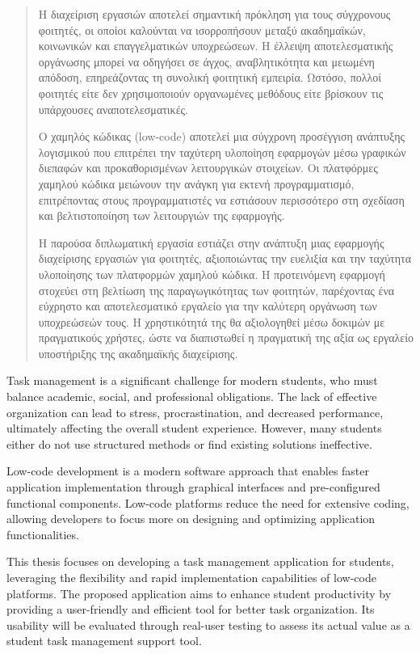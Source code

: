 \begin{abstract}
    Η διαχείριση εργασιών αποτελεί σημαντική πρόκληση για τους σύγχρονους φοιτητές, οι οποίοι καλούνται να ισορροπήσουν μεταξύ ακαδημαϊκών, κοινωνικών και επαγγελματικών υποχρεώσεων. Η έλλειψη αποτελεσματικής οργάνωσης μπορεί να οδηγήσει σε άγχος, αναβλητικότητα και μειωμένη απόδοση, επηρεάζοντας τη συνολική φοιτητική εμπειρία. Ωστόσο, πολλοί φοιτητές είτε δεν χρησιμοποιούν οργανωμένες μεθόδους είτε βρίσκουν τις υπάρχουσες αναποτελεσματικές.

    Ο χαμηλός κώδικας (low-code) αποτελεί μια σύγχρονη προσέγγιση ανάπτυξης λογισμικού που επιτρέπει την ταχύτερη υλοποίηση εφαρμογών μέσω γραφικών διεπαφών και προκαθορισμένων λειτουργικών στοιχείων. Οι πλατφόρμες χαμηλού κώδικα μειώνουν την ανάγκη για εκτενή προγραμματισμό, επιτρέποντας στους προγραμματιστές να εστιάσουν περισσότερο στη σχεδίαση και βελτιστοποίηση των λειτουργιών της εφαρμογής.

    Η παρούσα διπλωματική εργασία εστιάζει στην ανάπτυξη μιας εφαρμογής διαχείρισης εργασιών για φοιτητές, αξιοποιώντας την ευελιξία και την ταχύτητα υλοποίησης των πλατφορμών χαμηλού κώδικα. Η προτεινόμενη εφαρμογή στοχεύει στη βελτίωση της παραγωγικότητας των φοιτητών, παρέχοντας ένα εύχρηστο και αποτελεσματικό εργαλείο για την καλύτερη οργάνωση των υποχρεώσεών τους. Η χρηστικότητά της θα αξιολογηθεί μέσω δοκιμών με πραγματικούς χρήστες, ώστε να διαπιστωθεί η πραγματική της αξία ως εργαλείο υποστήριξης της ακαδημαϊκής διαχείρισης.

\end{abstract}


\begin{abstracteng}
    Task management is a significant challenge for modern students, who must balance academic, social, and professional obligations. The lack of effective organization can lead to stress, procrastination, and decreased performance, ultimately affecting the overall student experience. However, many students either do not use structured methods or find existing solutions ineffective.

    Low-code development is a modern software approach that enables faster application implementation through graphical interfaces and pre-configured functional components. Low-code platforms reduce the need for extensive coding, allowing developers to focus more on designing and optimizing application functionalities.

    This thesis focuses on developing a task management application for students, leveraging the flexibility and rapid implementation capabilities of low-code platforms. The proposed application aims to enhance student productivity by providing a user-friendly and efficient tool for better task organization. Its usability will be evaluated through real-user testing to assess its actual value as a student task management support tool.

\end{abstracteng}
